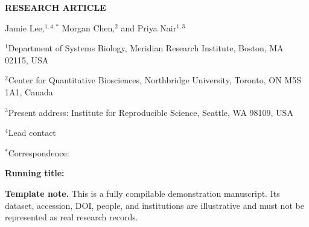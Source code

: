 \documentclass[11pt]{article}
\begin{document}
\linenumbers

\begin{flushleft}
  {\color{CellRed}\bfseries RESEARCH ARTICLE}\par
  \vspace{0.8em}
  {\LARGE\bfseries \ManuscriptTitle\par}
  \vspace{1.1em}

  {\large
  Jamie Lee,$^{1,4,*}$ Morgan Chen,$^{2}$ and Priya Nair$^{1,3}$\par}
  \vspace{0.8em}

  $^{1}$Department of Systems Biology, Meridian Research Institute,
  Boston, MA 02115, USA\par
  $^{2}$Center for Quantitative Biosciences, Northbridge University,
  Toronto, ON M5S 1A1, Canada\par
  $^{3}$Present address: Institute for Reproducible Science, Seattle,
  WA 98109, USA\par
  $^{4}$Lead contact\par
  $^{*}$Correspondence: \href{mailto:\LeadEmail}{\LeadEmail}\par
  \vspace{0.6em}
  \textbf{Running title:} \ShortTitle
\end{flushleft}

\vspace{1.2em}
\noindent\colorbox{CellLight}{%
  \parbox{\dimexpr\textwidth-2\fboxsep\relax}{%
    \textbf{Template note.} This is a fully compilable demonstration manuscript.
    Its dataset, accession, DOI, people, and institutions are illustrative and
    must not be represented as real research records.
  }}

















\end{document}
